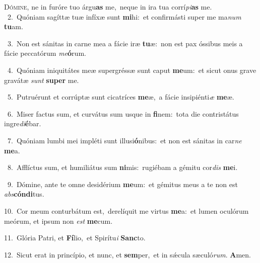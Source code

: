 \lettrine{\initial\textcolor{\initialcolor}{D}}{ómine,} ne in furóre tuo árgu\textbf{as} me,~\star neque in ira tua corrí\-\textit{pi}\-\textbf{as} me.\\
{\numbfont\textcolor{\numbcolor}{~2.}}~Quóniam sagíttæ tuæ infíxæ sunt \textbf{mi}\-hi:~\star et confirmásti super me ma\textit{num} \textbf{tu}\-am.\par
{\numbfont\textcolor{\numbcolor}{~3.}}~Non est sánitas in carne mea a fácie iræ \textbf{tu}\-æ:~\star non est pax óssibus meis a fácie peccatórum \textit{me}\-\textbf{ó}rum.\par
{\numbfont\textcolor{\numbcolor}{~4.}}~Quóniam iniquitátes meæ supergréssæ sunt caput \textbf{me}\-um:~\star et sicut onus grave gravátæ \textit{sunt} \textbf{su}\-\textbf{per} me.\par
{\numbfont\textcolor{\numbcolor}{~5.}}~Putruérunt et corrúptæ sunt cicatríces \textbf{me}\-æ,~\star a fácie insipiénti\textit{æ} \textbf{me}\-æ.\par
{\numbfont\textcolor{\numbcolor}{~6.}}~Miser factus sum, et curvátus sum usque in \textbf{fi}\-nem:~\star tota die contristátus ingre\-\textit{di}\-\textbf{é}bar.\par
{\numbfont\textcolor{\numbcolor}{~7.}}~Quóniam lumbi mei impléti sunt illusi\-\textbf{ó}\-nibus:~\star et non est sánitas in car\textit{ne} \textbf{me}\-a.\par
{\numbfont\textcolor{\numbcolor}{~8.}}~Afflíctus sum, et humiliátus sum \textbf{ni}\-mis:~\star rugiébam a gémitu cor\textit{dis} \textbf{me}\-i.\par
{\numbfont\textcolor{\numbcolor}{~9.}}~Dómine, ante te omne desidérium \textbf{me}\-um:~\star et gémitus meus a te non est \textit{abs}\-\textbf{cón}\textbf{di}tus.\par
{\numbfont\textcolor{\numbcolor}{10.}}~Cor meum conturbátum est,~\dagger derelíquit me virtus \textbf{me}\-a:~\star et lumen oculórum meórum, et ipsum non \textit{est} \textbf{me}\-cum.\par
{\numbfont\textcolor{\numbcolor}{11.}}~Glória Patri, et \textbf{Fí}\-lio,~\star et Spirítu\textit{i} \textbf{Sanc}\-to.\par
{\numbfont\textcolor{\numbcolor}{12.}}~Sicut erat in princípio, et nunc, et \textbf{sem}\-per,~\star et in sǽcula sæculó\-\textit{rum}\-. \textbf{A}\-men.\par
